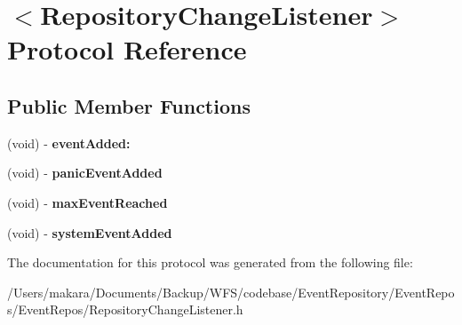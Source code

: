 \hypertarget{protocol_repository_change_listener-p}{
\section{$<$\-Repository\-Change\-Listener$>$ \-Protocol \-Reference}
\label{protocol_repository_change_listener-p}
}
\subsection*{\-Public \-Member \-Functions}
\begin{DoxyCompactItemize}
\item 
\hypertarget{protocol_repository_change_listener-p_a343db00c64ebc3d358220e3a56b8c5ce}{
(void) -\/ {\bfseries event\-Added\-:}}
\label{protocol_repository_change_listener-p_a343db00c64ebc3d358220e3a56b8c5ce}

\item 
\hypertarget{protocol_repository_change_listener-p_a8a2e7894078bb7858c370dbfe83178a0}{
(void) -\/ {\bfseries panic\-Event\-Added}}
\label{protocol_repository_change_listener-p_a8a2e7894078bb7858c370dbfe83178a0}

\item 
\hypertarget{protocol_repository_change_listener-p_a34ad7471d57a8c58e0591cc6164d4be9}{
(void) -\/ {\bfseries max\-Event\-Reached}}
\label{protocol_repository_change_listener-p_a34ad7471d57a8c58e0591cc6164d4be9}

\item 
\hypertarget{protocol_repository_change_listener-p_a8029ba33a7487a2db46096567b96ae39}{
(void) -\/ {\bfseries system\-Event\-Added}}
\label{protocol_repository_change_listener-p_a8029ba33a7487a2db46096567b96ae39}

\end{DoxyCompactItemize}


\-The documentation for this protocol was generated from the following file\-:\begin{DoxyCompactItemize}
\item 
/\-Users/makara/\-Documents/\-Backup/\-W\-F\-S/codebase/\-Event\-Repository/\-Event\-Repos/\-Event\-Repos/\-Repository\-Change\-Listener.\-h\end{DoxyCompactItemize}
